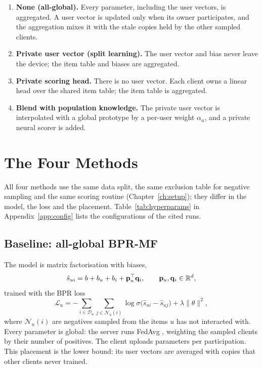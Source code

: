 \begin{enumerate}[leftmargin=2em]
  \item \textbf{None (all-global).} Every parameter, including the user vectors, is aggregated.
        A user vector is updated only when its owner participates, and the aggregation mixes it
        with the stale copies held by the other sampled clients.
  \item \textbf{Private user vector (split learning).} The user vector and bias never leave the
        device; the item table and biases are aggregated.
  \item \textbf{Private scoring head.} There is no user vector. Each client owns a linear head
        over the shared item table; the item table is aggregated.
  \item \textbf{Blend with population knowledge.} The private user vector is interpolated with a
        global prototype by a per-user weight $\alpha_u$, and a private neural scorer is added.
\end{enumerate}

\section{The Four Methods}
\label{sec:method-methods}

All four methods use the same data split, the same exclusion table for negative sampling and the
same scoring routine (Chapter~\ref{ch:setup}); they differ in the model, the loss and the
placement. Table~\ref{tab:hyperparams} in Appendix~\ref{app:config} lists the configurations of
the cited runs.

\subsection{Baseline: all-global BPR-MF}
\label{sec:method-baseline}

The model is matrix factorisation with biases,
\begin{equation}
  \hat{s}_{ui} = b + b_u + b_i + \mathbf{p}_u^\top \mathbf{q}_i, \qquad \mathbf{p}_u, \mathbf{q}_i \in \mathbb{R}^{d},
  \label{eq:mf}
\end{equation}
trained with the BPR loss \cite{rendle2009bpr}
\begin{equation}
  \mathcal{L}_u = -\sum_{i \in \mathcal{D}_u}\sum_{j \in \mathcal{N}_u(i)}
    \log \sigma\big(\hat{s}_{ui} - \hat{s}_{uj}\big) + \lambda \|\theta\|^2,
  \label{eq:bpr}
\end{equation}
where $\mathcal{N}_u(i)$ are negatives sampled from the items $u$ has not interacted with.
Every parameter is global: the server runs FedAvg \cite{mcmahan2017fedavg}, weighting the
sampled clients by their number of positives. The client uploads \ParamsBaselineGlobal{}
parameters per participation. This placement is the lower bound: its user vectors are averaged
with copies that other clients never trained.

